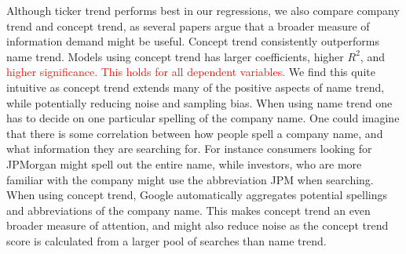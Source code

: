 Although ticker trend performs best in our regressions, we also compare company trend and concept trend, as several papers argue that a broader measure of information demand might be useful. Concept trend consistently outperforms name trend. Models using concept trend has larger coefficients, higher $R^2$, and \textcolor{red}{ higher significance. This holds for all dependent variables.} We find this quite intuitive as concept trend extends many of the positive aspects of name trend, while potentially reducing noise and sampling bias. When using name trend one has to decide on one particular spelling of the company name. One could imagine that there is some correlation between how people spell a company name, and what information they are searching for. For instance consumers looking for JPMorgan might spell out the entire name, while investors, who are more familiar with the company might use the abbreviation JPM when searching. When using concept trend, Google automatically aggregates potential spellings and abbreviations of the company name. This makes concept trend an even broader measure of attention, and might also reduce noise as the concept trend score is calculated from a larger pool of searches than name trend.

